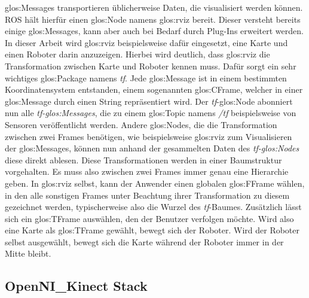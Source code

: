 \glspl{glos:Message} transportieren üblicherweise Daten, die visualisiert werden können. \gls{ROS} hält hierfür einen \gls{glos:Node} namens \gls{glos:rviz} bereit. Dieser versteht bereits einige \glspl{glos:Message}, kann aber auch bei Bedarf durch Plug-Ins erweitert werden. In dieser Arbeit wird \gls{glos:rviz} beispielsweise dafür eingesetzt, eine Karte und einen Roboter darin anzuzeigen. Hierbei wird deutlich, dass \gls{glos:rviz} die Transformation zwischen Karte und Roboter kennen muss. Dafür sorgt ein sehr wichtiges \gls{glos:Package} namens \emph{tf}. Jede \gls{glos:Message} ist in einem bestimmten Koordinatensystem entstanden, einem sogenannten \gls{glos:CFrame}, welcher in einer \gls{glos:Message} durch einen String repräsentiert wird. Der \emph{tf}-\gls{glos:Node} abonniert nun alle \emph{tf-\glspl{glos:Message}}, die zu einem \gls{glos:Topic} namens \emph{/tf} beispielsweise von Sensoren veröffentlicht werden. Andere \glspl{glos:Node}, die die Transformation zwischen zwei \glspl{Frame} benötigen, wie beispielsweise \gls{glos:rviz} zum Visualisieren der \glspl{glos:Message}, können nun anhand der gesammelten Daten des \emph{tf-\glspl{glos:Node}} diese direkt ablesen. Diese Transformationen werden in einer Baumstruktur vorgehalten. Es muss also zwischen zwei \glspl{Frame} immer genau eine Hierarchie geben. In \gls{glos:rviz} selbst, kann der Anwender einen globalen \gls{glos:FFrame} wählen, in den alle sonstigen \glspl{Frame} unter Beachtung ihrer Transformation zu diesem gezeichnet werden, typischerweise also die Wurzel des \emph{tf}-Baumes. Zusätzlich lässt sich ein \gls{glos:TFrame} auswählen, den der Benutzer verfolgen möchte. Wird also eine Karte als \gls{glos:TFrame} gewählt, bewegt sich der Roboter. Wird der Roboter selbst ausgewählt, bewegt sich die Karte während der Roboter immer in der Mitte bleibt.

\subsection{OpenNI\_Kinect Stack}

